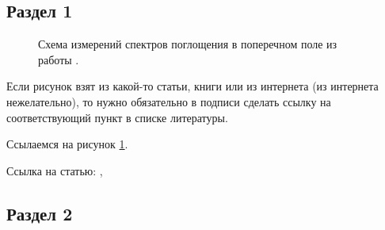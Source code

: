 \documentclass[a4paper,14pt]{extarticle}
\begin{document}
\subsection{Раздел 1}

\begin{figure}[ht]
    \begin{center}
    
    \caption{\label{fig:miller2-2}
        Схема измерений спектров поглощения в поперечном поле из работы \cite{Miller2}.}
    \end {center}
    \end {figure}
    
    Если рисунок взят из какой-то статьи, книги или из интернета (из интернета нежелательно), то нужно обязательно в подписи сделать ссылку на соответствующий пункт в списке литературы.

    Ссылаемся на рисунок \ref{fig:miller2-2}.
    
    Ссылка на статью: \cite{Miller2}, \cite{Mohseni}

\subsection{Раздел 2}

\pagebreak
\end{document}
